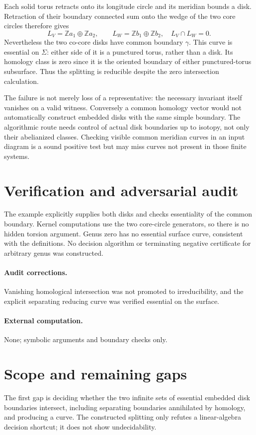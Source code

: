 \documentclass[11pt]{article}
\begin{document}
Each solid torus retracts onto its longitude circle and its meridian bounds a
disk. Retraction of their boundary connected sum onto the wedge of the two
core circles therefore gives
\[
 L_V=\mathbb Z a_1\oplus\mathbb Z a_2,\qquad
 L_W=\mathbb Z b_1\oplus\mathbb Z b_2,
 \quad L_V\cap L_W=0.
\]
Nevertheless the two co-core disks have common boundary $\gamma$. This curve
is essential on $\Sigma$: either side of it is a punctured torus, rather than
a disk. Its homology class is zero since it is the oriented boundary of either
punctured-torus subsurface. Thus the splitting is reducible despite the zero
intersection calculation.

The failure is not merely loss of a representative: the necessary invariant
itself vanishes on a valid witness. Conversely a common homology vector would
not automatically construct embedded disks with the same simple boundary.
The algorithmic route needs control of actual disk boundaries up to isotopy,
not only their abelianized classes. Checking visible common meridian curves in
an input diagram is a sound positive test but may miss curves not present in
those finite systems.
\section{Verification and adversarial audit}
The example explicitly supplies both disks and checks essentiality of the
common boundary. Kernel computations use the two core-circle generators, so
there is no hidden torsion argument. Genus zero has no essential surface curve,
consistent with the definitions. No decision algorithm or terminating negative
certificate for arbitrary genus was constructed.
\paragraph{Audit corrections.} Vanishing homological intersection was not promoted to irreducibility, and the explicit separating reducing curve was verified essential on the surface.
\paragraph{External computation.} None; symbolic arguments and boundary checks only.
\section{Scope and remaining gaps}
The first gap is deciding whether the two infinite sets of essential
embedded disk boundaries intersect, including separating boundaries annihilated
by homology, and producing a curve. The constructed splitting only refutes a
linear-algebra decision shortcut; it does not show undecidability.
\end{document}
